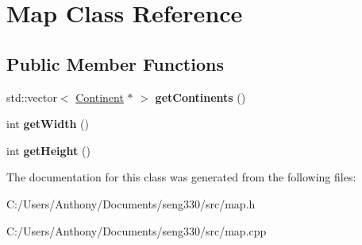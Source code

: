 \hypertarget{class_map}{}\section{Map Class Reference}
\label{class_map}
\subsection*{Public Member Functions}
\begin{DoxyCompactItemize}
\item 
\hypertarget{class_map_ad86eaa5a96061d9947535e2dd0177e2d}{}std\+::vector$<$ \hyperlink{class_continent}{Continent} $\ast$ $>$ {\bfseries get\+Continents} ()\label{class_map_ad86eaa5a96061d9947535e2dd0177e2d}

\item 
\hypertarget{class_map_afd34d12227676b3cebeed9f5fae2508f}{}int {\bfseries get\+Width} ()\label{class_map_afd34d12227676b3cebeed9f5fae2508f}

\item 
\hypertarget{class_map_a2b09c8875af2efb711fc3a022e70427d}{}int {\bfseries get\+Height} ()\label{class_map_a2b09c8875af2efb711fc3a022e70427d}

\end{DoxyCompactItemize}


The documentation for this class was generated from the following files\+:\begin{DoxyCompactItemize}
\item 
C\+:/\+Users/\+Anthony/\+Documents/seng330/src/map.\+h\item 
C\+:/\+Users/\+Anthony/\+Documents/seng330/src/map.\+cpp\end{DoxyCompactItemize}
